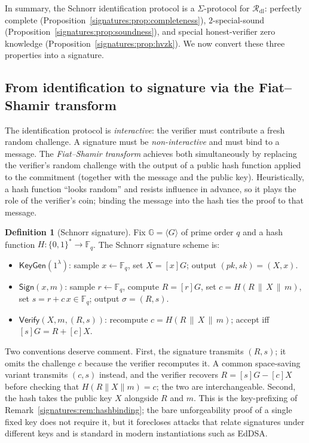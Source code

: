 \documentclass[11pt,a4paper]{article}
\theoremstyle{definition}
\newtheorem{definition}[theorem]{Definition}
\theoremstyle{remark}
\newcommand{\G}{\ensuremath{\mathbb{G}}}
\newcommand{\Fq}{\ensuremath{\mathbb{F}_{q}}}
\begin{document}
In summary, the Schnorr identification protocol is a \(\Sigma\)-protocol for \(\mathcal{R}_{\mathrm{dl}}\): perfectly complete (Proposition~\ref{signatures:prop:completeness}), \(2\)-special-sound (Proposition~\ref{signatures:prop:soundness}), and special honest-verifier zero knowledge (Proposition~\ref{signatures:prop:hvzk}). We now convert these three properties into a signature.
\subsection{From identification to signature via the Fiat--Shamir transform}\label{signatures:subsec:fiatshamir}

The identification protocol is \emph{interactive}: the verifier must contribute a fresh random challenge. A signature must be \emph{non-interactive} and must bind to a message. The \emph{Fiat--Shamir transform} achieves both simultaneously by replacing the verifier's random challenge with the output of a public hash function applied to the commitment (together with the message and the public key). Heuristically, a hash function ``looks random'' and resists influence in advance, so it plays the role of the verifier's coin; binding the message into the hash ties the proof to that message.

\begin{definition}[Schnorr signature]\label{signatures:def:schnorrsig}
Fix \(\G = \langle G\rangle\) of prime order \(q\) and a hash function \(H : \{0,1\}^\ast \to \Fq\). The Schnorr signature scheme is:
\begin{itemize}
  \item \(\mathsf{KeyGen}(1^\lambda)\): sample \(x \gets \Fq\), set \(X = [x]G\); output \((\mathit{pk}, \mathit{sk}) = (X, x)\).
  \item \(\mathsf{Sign}(x, m)\): sample \(r \gets \Fq\), compute \(R = [r]G\), set \(c = H(R \,\|\, X \,\| \,m)\), set \(s = r + c\,x \in \Fq\); output \(\sigma = (R, s)\).
  \item \(\mathsf{Verify}(X, m, (R,s))\): recompute \(c = H(R \,\|\, X \,\|\, m)\); accept iff \([s]G = R + [c]X\).
\end{itemize}
\end{definition}

Two conventions deserve comment. First, the signature transmits \((R, s)\); it omits the challenge \(c\) because the verifier recomputes it. A common space-saving variant transmits \((c, s)\) instead, and the verifier recovers \(R = [s]G - [c]X\) before checking that \(H(R \| X \| m) = c\); the two are interchangeable. Second, the hash takes the public key \(X\) alongside \(R\) and \(m\). This is the key-prefixing of Remark~\ref{signatures:rem:hashbinding}; the bare unforgeability proof of a single fixed key does not require it, but it forecloses attacks that relate signatures under different keys and is standard in modern instantiations such as EdDSA.
\end{document}
